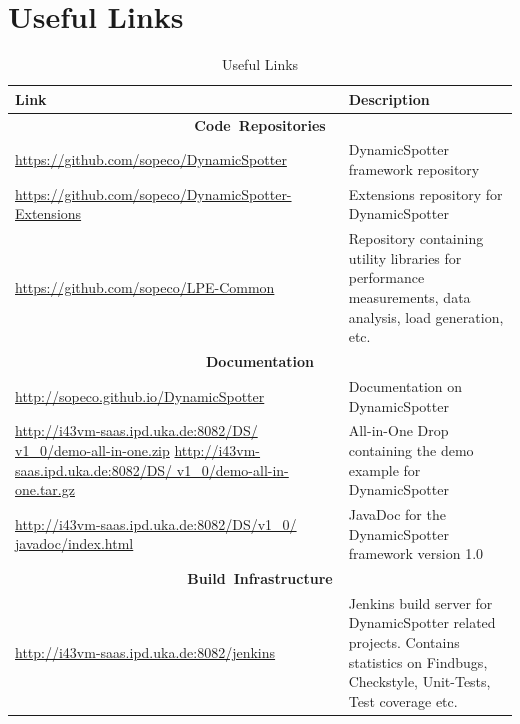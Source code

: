\documentclass{report}
\newcommand{\DS}{DynamicSpotter }
\newcommand{\link}[1]{\textcolor[rgb]{0.0,0.0,1.0}{\href{#1}{#1}}}
\begin{document}
\newpage
\section{Useful Links}
\label{sec:links}
\begin{table}[h]
\centering
\begin{tabular}{p{}p{}}
\toprule
 \textbf{Link} & \textbf{Description}\\
\midrule
\midrule
\multicolumn{2}{c}{\mbox{\textbf{Code Repositories}}}\\
\midrule
\small{\link{https://github.com/sopeco/DynamicSpotter}} & \DS framework
repository\\
\midrule
\small{\link{https://github.com/sopeco/DynamicSpotter-Extensions}}
& Extensions repository for \DS\\
\midrule
\small{\link{https://github.com/sopeco/LPE-Common}} & Repository containing
utility libraries for performance measurements, data analysis, load generation, etc.\\
\midrule
\multicolumn{2}{c}{\mbox{\textbf{Documentation}}}\\
\midrule
\small{\link{http://sopeco.github.io/DynamicSpotter}}
& Documentation on \DS\\
\midrule
\small{\textcolor[rgb]{0.0,0.0,1.0}{\href{http://i43vm-saas.ipd.uka.de:8082/DS/v1\_0/demo-all-in-one.zip}{http://i43vm-saas.ipd.uka.de:8082/DS/
v1\_0/demo-all-in-one.zip}}}
\newline
\newline
\small{\textcolor[rgb]{0.0,0.0,1.0}{\href{http://i43vm-saas.ipd.uka.de:8082/DS/v1\_0/demo-all-in-one.zip}{http://i43vm-saas.ipd.uka.de:8082/DS/
v1\_0/demo-all-in-one.tar.gz}}}
& All-in-One Drop containing the demo example for \DS\\
\midrule
\small{\textcolor[rgb]{0.0,0.0,1.0}{\href{http://i43vm-saas.ipd.uka.de:8082/DS/v1\_0/javadoc/index.html}{http://i43vm-saas.ipd.uka.de:8082/DS/v1\_0/
javadoc/index.html}}} & JavaDoc for the \DS framework version 1.0\\
\midrule
\multicolumn{2}{c}{\mbox{\textbf{Build Infrastructure}}}\\
\midrule
\small{\link{http://i43vm-saas.ipd.uka.de:8082/jenkins}}
& Jenkins build server for \DS related projects. Contains statistics on Findbugs, Checkstyle, Unit-Tests, Test
coverage etc.\\
\bottomrule
\end{tabular}
\caption{Useful Links}
\label{tab:usefulLinks}
\end{table}



\end{document}
